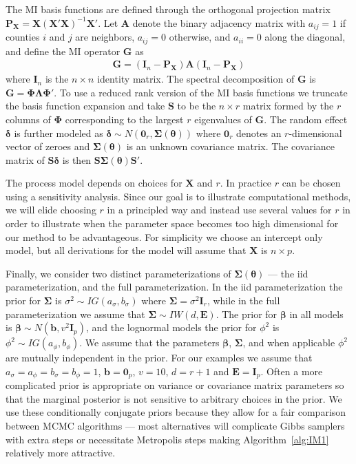 \documentclass[12pt]{article}
\begin{document}
The MI basis functions are defined through the orthogonal projection matrix $\bm{P}_{\bm{X}} = \bm{X}(\bm{X}'\bm{X})^{-1}\bm{X}'$. Let $\bm{A}$ denote the binary adjacency matrix with $a_{ij} = 1$ if counties $i$ and $j$ are neighbors, $a_{ij}=0$ otherwise, and $a_{ii}=0$ along the diagonal, and define the MI operator $\bm{G}$ as
\begin{align*}
\bm{G} = (\bm{I}_n - \bm{P}_{\bm{X}})\bm{A}(\bm{I}_n - \bm{P}_{\bm{X}})
\end{align*}
where $\bm{I}_n$ is the $n\times n$ identity matrix. The spectral decomposition of $\bm{G}$ is $\bm{G} = \bm{\Phi}\bm{\Lambda}\bm{\Phi}'.$ To use a reduced rank version of the MI basis functions we truncate the basis function expansion and take $\bm{S}$ to be the $n\times r$ matrix formed by the $r$ columns of $\bm{\Phi}$ corresponding to the largest $r$ eigenvalues of $\bm{G}$. The random effect $\bm{\delta}$ is further modeled as $\bm{\delta} \sim N(\bm{0}_r,\bm{\Sigma}(\bm{\theta}))$ where $\bm{0}_r$ denotes an $r$-dimensional vector of zeroes and $\bm{\Sigma}(\bm{\theta})$ is an unknown covariance matrix. The covariance matrix of $\bm{S}\bm{\delta}$ is then $\bm{S}\bm{\Sigma}(\bm{\theta})\bm{S}'$.

The process model depends on choices for $\bm{X}$ and $r$. In practice $r$ can be chosen using a sensitivity analysis. Since our goal is to illustrate computational methods, we will elide choosing $r$ in a principled way and instead use several values for $r$ in order to illustrate when the parameter space becomes too high dimensional for our method to be advantageous. For simplicity we choose an intercept only model, but all derivations for the model will assume that $\bm{X}$ is $n\times p$.

Finally, we consider two distinct parameterizations of $\bm{\Sigma}(\bm{\theta})$ --- the iid parameterization, and the full parameterization. In the iid parameterization the prior for $\bm{\Sigma}$ is $\sigma^2 \sim IG(a_\sigma, b_\sigma)$ where $\bm{\Sigma}=\sigma^2\bm{I}_r$, while in the full parameterization we assume that $\bm{\Sigma}\sim IW(d, \bm{E})$. The prior for $\bm{\beta}$ in all models is $\bm{\beta} \sim N(\bm{b}, v^2\bm{I}_p)$, and the lognormal models the prior for $\phi^2$ is $\phi^2 \sim IG(a_\phi, b_\phi)$. We assume that the parameters $\bm{\beta}$, $\bm{\Sigma}$, and when applicable $\phi^2$ are mutually independent in the prior. For our examples we assume that $a_\sigma = a_\phi = b_\sigma = b_\phi = 1$, $\bm{b} = \bm{0}_p$, $v = 10$, $d = r + 1$ and $\bm{E} = \bm{I}_p$. Often a more complicated prior is appropriate on variance or covariance matrix parameters so that the marginal posterior is not sensitive to arbitrary choices in the prior. We use these conditionally conjugate priors because they allow for a fair comparison between MCMC algorithms --- most alternatives will complicate Gibbs samplers with extra steps or necessitate Metropolis steps  making Algorithm~\ref{alg:IM1} relatively more attractive.
\end{document}
